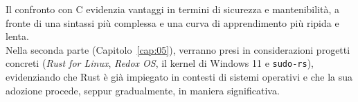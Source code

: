 Il confronto con C evidenzia vantaggi in termini di sicurezza e mantenibilità, a fronte di una sintassi più complessa 
e una curva di apprendimento più ripida e lenta. \hfill 
\vspace{8pt}\\
\noindent Nella seconda parte (Capitolo~\ref{cap:05}), verranno presi in considerazioni progetti concreti (\textit{Rust for Linux}, \textit{Redox OS}, il kernel di Windows 11 e \texttt{sudo-rs}), 
evidenziando che Rust è già impiegato in contesti di sistemi operativi e che la sua adozione procede, seppur gradualmente, in maniera significativa. 